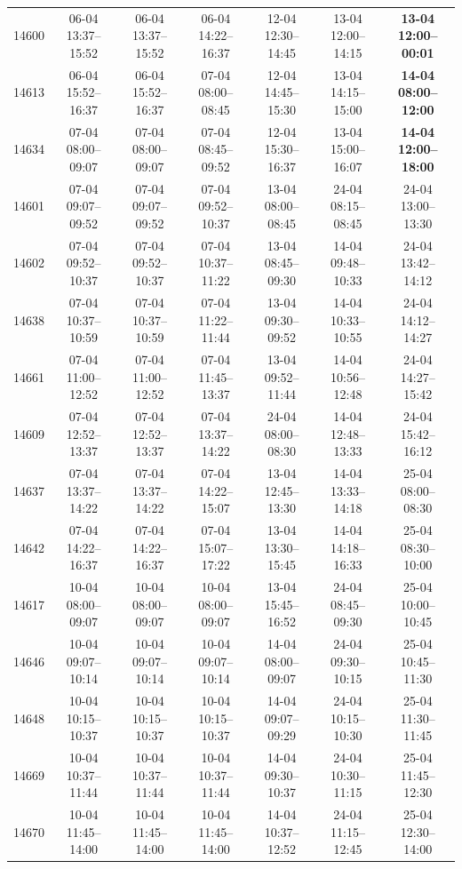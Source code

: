 \begin{table}[htbp]
\begin{tabular}{|r|c|c|c|c|c|c|}
14600 & 06-04 13:37--15:52 & 06-04 13:37--15:52 & 06-04 14:22--16:37 & 12-04 12:30--14:45 & 13-04 12:00--14:15 & \textbf{13-04 12:00--00:01} \\ 
14613 & 06-04 15:52--16:37 & 06-04 15:52--16:37 & 07-04 08:00--08:45 & 12-04 14:45--15:30 & 13-04 14:15--15:00 & \textbf{14-04 08:00--12:00} \\ 
14634 & 07-04 08:00--09:07 & 07-04 08:00--09:07 & 07-04 08:45--09:52 & 12-04 15:30--16:37 & 13-04 15:00--16:07 & \textbf{14-04 12:00--18:00} \\ 
14601 & 07-04 09:07--09:52 & 07-04 09:07--09:52 & 07-04 09:52--10:37 & 13-04 08:00--08:45 & 24-04 08:15--08:45 & 24-04 13:00--13:30 \\ 
14602 & 07-04 09:52--10:37 & 07-04 09:52--10:37 & 07-04 10:37--11:22 & 13-04 08:45--09:30 & 14-04 09:48--10:33 & 24-04 13:42--14:12 \\ 
14638 & 07-04 10:37--10:59 & 07-04 10:37--10:59 & 07-04 11:22--11:44 & 13-04 09:30--09:52 & 14-04 10:33--10:55 & 24-04 14:12--14:27 \\ 
14661 & 07-04 11:00--12:52 & 07-04 11:00--12:52 & 07-04 11:45--13:37 & 13-04 09:52--11:44 & 14-04 10:56--12:48 & 24-04 14:27--15:42 \\ 
14609 & 07-04 12:52--13:37 & 07-04 12:52--13:37 & 07-04 13:37--14:22 & 24-04 08:00--08:30 & 14-04 12:48--13:33 & 24-04 15:42--16:12 \\ 
14637 & 07-04 13:37--14:22 & 07-04 13:37--14:22 & 07-04 14:22--15:07 & 13-04 12:45--13:30 & 14-04 13:33--14:18 & 25-04 08:00--08:30 \\ 
14642 & 07-04 14:22--16:37 & 07-04 14:22--16:37 & 07-04 15:07--17:22 & 13-04 13:30--15:45 & 14-04 14:18--16:33 & 25-04 08:30--10:00 \\ 
14617 & 10-04 08:00--09:07 & 10-04 08:00--09:07 & 10-04 08:00--09:07 & 13-04 15:45--16:52 & 24-04 08:45--09:30 & 25-04 10:00--10:45 \\ 
14646 & 10-04 09:07--10:14 & 10-04 09:07--10:14 & 10-04 09:07--10:14 & 14-04 08:00--09:07 & 24-04 09:30--10:15 & 25-04 10:45--11:30 \\ 
14648 & 10-04 10:15--10:37 & 10-04 10:15--10:37 & 10-04 10:15--10:37 & 14-04 09:07--09:29 & 24-04 10:15--10:30 & 25-04 11:30--11:45 \\ 
14669 & 10-04 10:37--11:44 & 10-04 10:37--11:44 & 10-04 10:37--11:44 & 14-04 09:30--10:37 & 24-04 10:30--11:15 & 25-04 11:45--12:30 \\ 
14670 & 10-04 11:45--14:00 & 10-04 11:45--14:00 & 10-04 11:45--14:00 & 14-04 10:37--12:52 & 24-04 11:15--12:45 & 25-04 12:30--14:00 \\ 

\end{tabular}
\end{table}
